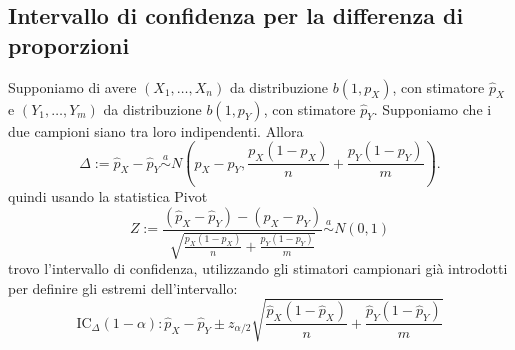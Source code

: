 \subsection{Intervallo di confidenza per la differenza di proporzioni}

Supponiamo di avere \((X_1,\dotsc,X_n)\) da distribuzione \(b(1,p_X)\), con stimatore \(\hat{p}_X\) e \((Y_1,\dotsc,Y_m)\) da distribuzione \(b(1,p_Y)\), con stimatore \(\hat{p}_Y\). Supponiamo che i due campioni siano tra loro indipendenti. Allora
\begin{equation}
  \Delta := \hat{p}_X - \hat{p}_Y \stackrel{a}{\sim}
  N\left(p_X - p_Y, \frac{p_X(1-p_X)}{n} + \frac{p_Y(1-p_Y)}{m}\right).
\end{equation}
 quindi usando la statistica Pivot 
\begin{equation*}
  Z := \frac{(\hat{p}_X - \hat{p}_Y) - (p_X - p_Y)}{\sqrt{\frac{p_X(1-p_X)}{n} + \frac{p_Y(1-p_Y)}{m}}} \stackrel{a}{\sim} N(0,1)
\end{equation*}
trovo l'intervallo di confidenza, utilizzando gli stimatori campionari già introdotti per definire gli estremi dell'intervallo:
\begin{equation*}
  \mathrm{IC}_{\Delta}(1-\alpha) \colon \hat{p}_X - \hat{p}_Y \pm
  z_{\alpha/2}\sqrt{\frac{\hat{p}_X(1-\hat{p}_X)}{n} + \frac{\hat{p}_Y(1-\hat{p}_Y)}{m}}
\end{equation*}
